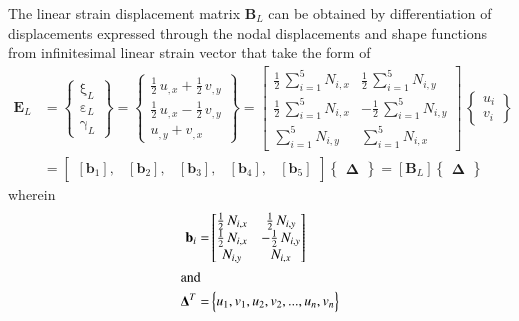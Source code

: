 The linear strain displacement matrix $\mathbf{B}_L$ can be obtained by differentiation of displacements expressed through the nodal displacements and shape functions from infinitesimal linear strain vector that take the form of
\begin{equation}
\begin{aligned}
\mathbf{E}_L & =  \begin{Bmatrix}
\mathrm \xi_{L} \\
\mathrm \varepsilon_{L} \\
\mathrm \gamma_{L} \end{Bmatrix} = 
\begin{Bmatrix}
\tfrac{1}{2} \, u_{,x} +   \tfrac{1}{2} \, v_{,y} \\
\tfrac{1}{2} \, u_{,x} - \tfrac{1}{2} \, v_{,y} \\
u_{,y} + v_{,x} \end{Bmatrix} = \begin{bmatrix}
\tfrac{1}{2} \, \sum\nolimits_{i=1}^5 N_{i,x}  & \tfrac{1}{2} \, \sum\nolimits_{i=1}^5 N_{i,y}  \\
\tfrac{1}{2} \, \sum\nolimits_{i=1}^5 N_{i,x}  & -\tfrac{1}{2} \, \sum\nolimits_{i=1}^5 N_{i,y}  \\ \sum\nolimits_{i=1}^5 N_{i,y}  & \sum\nolimits_{i=1}^5 N_{i,x}  \end{bmatrix} \, \begin{Bmatrix}
u_{i} \\
v_{i} \end{Bmatrix} \\
& = \begin{bmatrix}
[\mathbf{b}_1], & [\mathbf{b}_2], & [\mathbf{b}_3], & [\mathbf{b}_4], & [\mathbf{b}_5] 
\end{bmatrix}  \begin{Bmatrix} \boldsymbol{\Delta} \end{Bmatrix}  
= [\mathbf{B}_L] \begin{Bmatrix} \boldsymbol{\Delta} \end{Bmatrix} 
\end{aligned}
\end{equation}
wherein 
\begin{subequations}
\begin{align}
\mathbf{b}_i = & \begin{bmatrix}
\tfrac{1}{2} \, N_{i,x}  &  \tfrac{1}{2} \, N_{i,y} \\
\tfrac{1}{2} \, N_{i,x}  & - \tfrac{1}{2} \, N_{i,y} \\
N_{i,y} & N_{i,x}  \end{bmatrix}\\
\intertext{and}
\mathbf{\Delta}^T  = &
\begin{Bmatrix}
u_1, v_1, u_2, v_2, ...,u_n, v_n
\end{Bmatrix}
\end{align}
\end{subequations}
